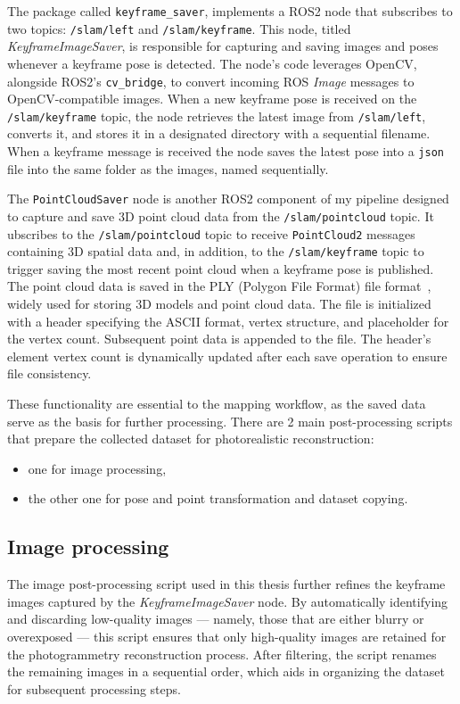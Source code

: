 The package called \verb|keyframe_saver|, implements a ROS2 node that subscribes to two topics: \verb|/slam/left| and \verb|/slam/keyframe|. This node, titled \textit{KeyframeImageSaver}, is responsible for capturing and saving images and poses whenever a keyframe pose is detected. The node’s code leverages OpenCV, alongside ROS2's \verb|cv_bridge|, to convert incoming ROS \textit{Image} messages to OpenCV-compatible images. When a new keyframe pose is received on the \verb|/slam/keyframe| topic, the node retrieves the latest image from \verb|/slam/left|, converts it, and stores it in a designated directory with a sequential filename. When a keyframe message is received the node saves the latest pose into a \verb|json| file into the same folder as the images, named sequentially.

The \verb|PointCloudSaver| node is another ROS2 component of my pipeline designed to capture and save 3D point cloud data from the \verb|/slam/pointcloud| topic. It ubscribes to the \verb|/slam/pointcloud| topic to receive \verb|PointCloud2| messages containing 3D spatial data and, in addition, to the \verb|/slam/keyframe| topic to trigger saving the most recent point cloud when a keyframe pose is published. The point cloud data is saved in the PLY (Polygon File Format) file format~\cite{ply_format}, widely used for storing 3D models and point cloud data. The file is initialized with a header specifying the ASCII format, vertex structure, and placeholder for the vertex count. Subsequent point data is appended to the file. The header's element vertex count is dynamically updated after each save operation to ensure file consistency.

These functionality are essential to the mapping workflow, as the saved data serve as the basis for further processing. There are 2 main post-processing scripts that prepare the collected dataset for photorealistic reconstruction:
\begin{itemize}
    \item one for image processing,
    \item the other one for pose and point transformation and dataset copying.
\end{itemize}

\subsection{Image processing}

The image post-processing script used in this thesis further refines the keyframe images captured by the \textit{KeyframeImageSaver} node. By automatically identifying and discarding low-quality images — namely, those that are either blurry or overexposed — this script ensures that only high-quality images are retained for the photogrammetry reconstruction process. After filtering, the script renames the remaining images in a sequential order, which aids in organizing the dataset for subsequent processing steps.

